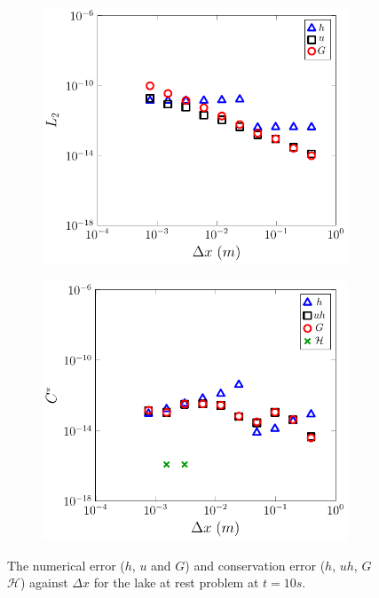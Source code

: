 \documentclass[times]{elsarticle}
\begin{document}
\begin{figure}
	\centering
	\begin{subfigure}{0.49\textwidth}
		\includegraphics[width=\textwidth]{./Figures/LakeAtRest/L2.pdf}
		\label{fig:LARL1}
		\vspace{0.5cm}
	\end{subfigure}
	\begin{subfigure}{0.49\textwidth}
		\includegraphics[width=\textwidth]{./Figures/LakeAtRest/C1num.pdf}
		\label{fig:LARC}
		\vspace{0.5cm}
	\end{subfigure}
	\caption{The numerical error ($h$, $u$ and $G$) and conservation error ($h$, $uh$, $G$ $\mathcal{H}$) against $\Delta x$ for the lake at rest problem at $t=10s$. }
	\label{fig:LARL2C}
\end{figure}
\end{document}
